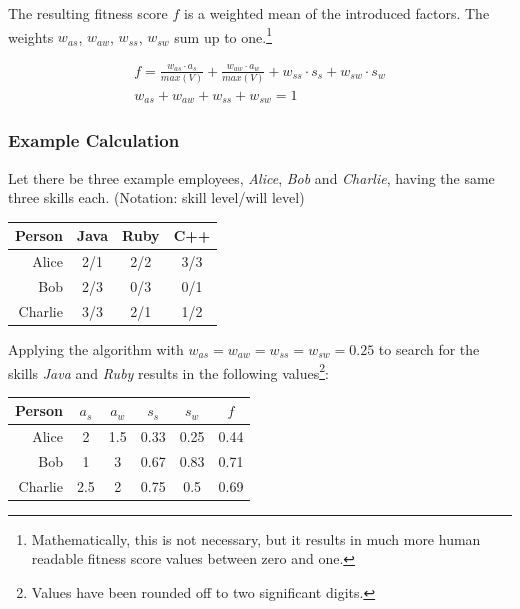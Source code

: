 The resulting fitness score $f$ is a weighted mean of the introduced factors. The weights $w_{as}$, $w_{aw}$, $w_{ss}$, $w_{sw}$ sum up to one.\footnote{Mathematically, this is not necessary, but it results in much more human readable fitness score values between zero and one.}

\begin{gather*}
  f = \frac{w_{as} \cdot a_s}{max(V)} + \frac{w_{aw} \cdot a_w}{ max(V)} + w_{ss} \cdot s_s + w_{sw} \cdot s_w \\
  w_{as} + w_{aw} + w_{ss} + w_{sw} = 1
\end{gather*}

\newpage
\subsubsection{Example Calculation}
Let there be three example employees, \textit{Alice}, \textit{Bob} and \textit{Charlie}, having the same three skills each.
(Notation: skill level/will level)
\label{example-fitness}
\newline
\newline
\begin{center}
\begin{tabular}{r|ccc}
  Person  & Java & Ruby & C++ \\
  \hline
  Alice   & 2/1  & 2/2 & 3/3 \\
  Bob     & 2/3  & 0/3 & 0/1 \\
  Charlie & 3/3  & 2/1 & 1/2 \\
\end{tabular}
\end{center}

Applying the algorithm with $w_{as} = w_{aw} = w_{ss} = w_{sw} = 0.25$ to search for the skills \textit{Java} and \textit{Ruby} results in the following values\footnote{Values have been rounded off to two significant digits.}:


\begin{center}
\begin{tabular}{r|cccc|c}
  Person  & $a_s$ & $a_w$ & $s_s$ & $s_w$ & $f$\\
  \hline
  Alice   & 2   & 1.5 & 0.33 & 0.25 & 0.44\\
  Bob     & 1   & 3   & 0.67 & 0.83 & 0.71\\
  Charlie & 2.5 & 2   & 0.75 & 0.5  & 0.69\\
\end{tabular}
\end{center}

